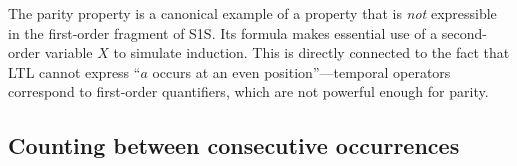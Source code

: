 \begin{remark}
The parity property is a canonical example of a property that is
\emph{not} expressible in the first-order fragment of S1S.  Its formula
makes essential use of a second-order variable $X$ to simulate induction.
This is directly connected to the fact that LTL cannot express ``$a$ occurs
at an even position''---temporal operators correspond to first-order
quantifiers, which are not powerful enough for parity.
\end{remark}

\subsection{Counting between consecutive occurrences}
\label{sec:s1s-counting}


